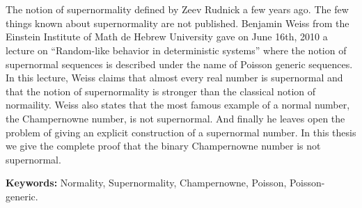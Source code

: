 \chapter*{\runtitle}

\noindent 
\noindent 

The notion of supernormality defined by Zeev Rudnick a few years ago.
The few things known about supernormality are not published. Benjamin Weiss from the Einstein Institute of Math de Hebrew University gave on June 16th, 2010 a lecture on “Random-like behavior
in deterministic systems” where the notion of supernormal sequences is described under the name of Poisson generic sequences.
In this lecture, Weiss claims that almost every real number is supernormal and that the notion of supernormality is stronger than the classical notion of normaility.
Weiss also states that the most famous example of a normal number, the Champernowne number, is not supernormal. And finally he leaves open the problem of giving an explicit construction of a supernormal number.
In this thesis we give the complete proof that the binary Champernowne number is not supernormal.
\bigskip

\noindent\textbf{Keywords:} Normality, Supernormality, Champernowne, Poisson, Poisson-generic.